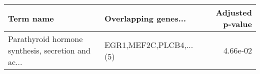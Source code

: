 \begin{tabular}{llr}
\toprule
                                         Term name &    Overlapping genes... &  Adjusted p-value \\
\midrule
Parathyroid hormone synthesis, secretion and ac... & EGR1,MEF2C,PLCB4,...(5) &          4.66e-02 \\
\bottomrule
\end{tabular}
